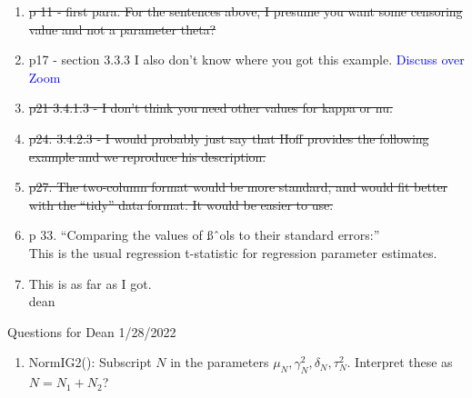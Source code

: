 \documentclass[12pt, a4paper]{article}
\begin{document}
\begin{enumerate}
    For continuous pdfs its trickier.\\\\

    You can use whichever notation you like - but you have to define it if it’s unusual.  It needs to be clear what you are conditioning on, and what is unknown (or random)\\\\
    \textcolor{blue}{By ``whichever notation" do you mean choosing between $p(\theta|data)$ and $L(\theta)$?  Also, if I go with likelihood, do I need to say $L(\theta|data)$ or is there no need because ``given the data" is understood by definition of likelihood?}
  \item \sout{p 11 - first para.  For the sentences above, I presume you want some censoring value and not a parameter theta?}
  \item p17 - section 3.3.3  I also don't know where you got this example. \textcolor{blue}{Discuss over Zoom}
  \item \sout{p21 3.4.1.3 - I don't think you need other values for kappa or nu.}
  \item \sout{p24. 3.4.2.3 - I would probably just say that Hoff provides the following example and we reproduce his description.}
  \item \sout{p27. The two-column format would be more standard, and would fit better with the “tidy” data format.  It would be easier to use.}
  \item p 33.  ``Comparing the values of ßˆols to their standard errors:”\\
    This is the usual regression t-statistic for regression parameter estimates.
  \item This is as far as I got.\\
    dean

\end{enumerate}

{\huge Questions for Dean 1/28/2022}
\begin{enumerate}
  \item NormIG2():  Subscript $N$ in the parameters $\mu_N,\gamma^2_N,\delta_N,\tau^2_N$. Interpret these as $N = N_1 + N_2$?
\end{enumerate}
\end{document}
